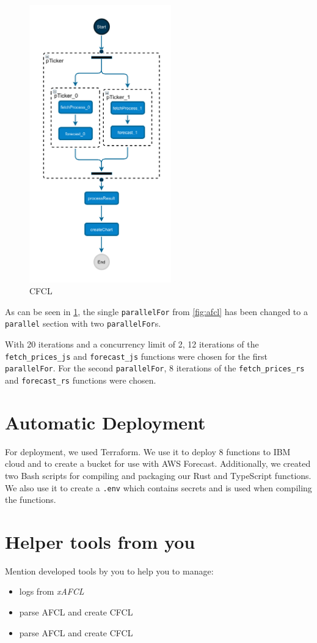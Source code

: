 \begin{figure}[h]
  \centering
  \includegraphics[height=12cm, keepaspectratio]{./assets/cfcl}
  \caption{CFCL}
  \label{fig:cfcl}
\end{figure}

As can be seen in \cref{fig:cfcl}, the single \texttt{parallelFor} from \cref{fig:afcl} has
been changed to a \texttt{parallel} section with two \texttt{parallelFor}s.

With 20 iterations and a concurrency limit of 2, 12 iterations of the \texttt{fetch\_prices\_js} and \texttt{forecast\_js}
functions were chosen for the first \texttt{parallelFor}. For the second \texttt{parallelFor},
8 iterations of the \texttt{fetch\_prices\_rs} and \texttt{forecast\_rs} functions were chosen.




%
%
%
\section{Automatic Deployment}

For deployment, we used Terraform. We use it to deploy 8 functions to IBM cloud and
to create a bucket for use with AWS Forecast. Additionally, we created two Bash scripts
for compiling and packaging our Rust and TypeScript functions. We also use it to create
a \texttt{.env} which contains secrets and is used when compiling the functions.



%
%
%
\section{Helper tools from you}

Mention developed tools by you to help you to manage:
\begin{itemize}
    \item logs from \textit{xAFCL}
    \item parse AFCL and create CFCL
    \item parse AFCL and create CFCL
\end{itemize}

